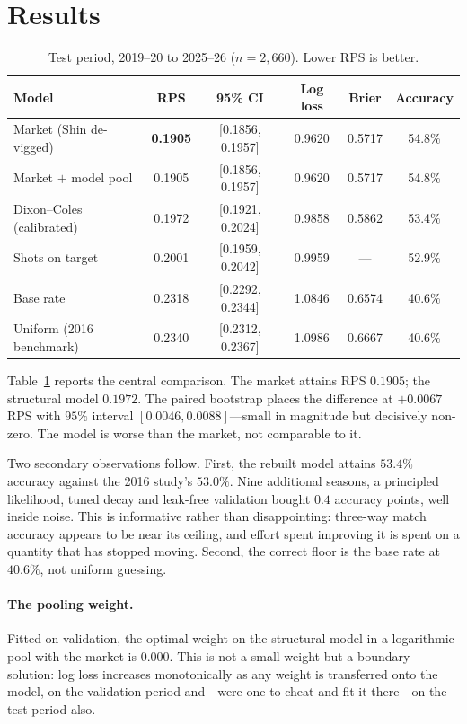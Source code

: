 \documentclass[11pt]{article}
\begin{document}
\section{Results}
\label{sec:results}

\begin{table}[t]
\centering
\caption{Test period, 2019--20 to 2025--26 ($n = 2{,}660$). Lower RPS is better.}
\label{tab:main}
\small
\begin{tabular}{lccccc}
\toprule
Model & RPS & 95\% CI & Log loss & Brier & Accuracy \\
\midrule
Market (Shin de-vigged)      & \textbf{0.1905} & [0.1856, 0.1957] & 0.9620 & 0.5717 & 54.8\% \\
Market $+$ model pool        & 0.1905 & [0.1856, 0.1957] & 0.9620 & 0.5717 & 54.8\% \\
Dixon--Coles (calibrated)    & 0.1972 & [0.1921, 0.2024] & 0.9858 & 0.5862 & 53.4\% \\
Shots on target              & 0.2001 & [0.1959, 0.2042] & 0.9959 & --- & 52.9\% \\
Base rate                    & 0.2318 & [0.2292, 0.2344] & 1.0846 & 0.6574 & 40.6\% \\
Uniform (2016 benchmark)     & 0.2340 & [0.2312, 0.2367] & 1.0986 & 0.6667 & 40.6\% \\
\bottomrule
\end{tabular}
\end{table}

Table~\ref{tab:main} reports the central comparison. The market attains RPS
$0.1905$; the structural model $0.1972$. The paired bootstrap places the
difference at $+0.0067$ RPS with $95\%$ interval $[0.0046, 0.0088]$---small in
magnitude but decisively non-zero. The model is worse than the market, not
comparable to it.

Two secondary observations follow. First, the rebuilt model attains $53.4\%$
accuracy against the 2016 study's $53.0\%$. Nine additional seasons, a
principled likelihood, tuned decay and leak-free validation bought $0.4$
accuracy points, well inside noise. This is informative rather than
disappointing: three-way match accuracy appears to be near its ceiling, and
effort spent improving it is spent on a quantity that has stopped moving.
Second, the correct floor is the base rate at $40.6\%$, not uniform guessing.

\paragraph{The pooling weight.} Fitted on validation, the optimal weight on the
structural model in a logarithmic pool with the market is $0.000$. This is not a
small weight but a boundary solution: log loss increases monotonically as any
weight is transferred onto the model, on the validation period and---were one to
cheat and fit it there---on the test period also.
\end{document}
